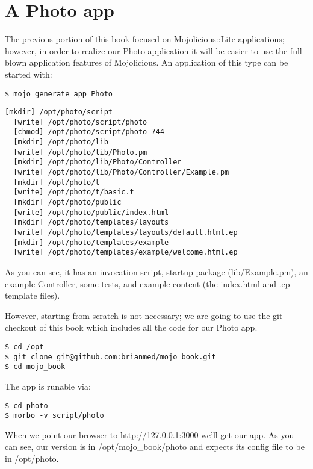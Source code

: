 \documentclass[14pt]{extreport}
\begin{document}
\section{A Photo app}

The previous portion of this book focused on Mojolicious::Lite applications;
however, in order to realize our Photo application it will be easier to use the
full blown application features of Mojolicious.  An application of this type
can be started with:

\begin{lstlisting}[style=BashInputStyle]
$ mojo generate app Photo           
\end{lstlisting}

\begin{lstlisting}[style=BashOutputStyle]
  [mkdir] /opt/photo/script
  [write] /opt/photo/script/photo
  [chmod] /opt/photo/script/photo 744
  [mkdir] /opt/photo/lib
  [write] /opt/photo/lib/Photo.pm
  [mkdir] /opt/photo/lib/Photo/Controller
  [write] /opt/photo/lib/Photo/Controller/Example.pm
  [mkdir] /opt/photo/t
  [write] /opt/photo/t/basic.t
  [mkdir] /opt/photo/public
  [write] /opt/photo/public/index.html
  [mkdir] /opt/photo/templates/layouts
  [write] /opt/photo/templates/layouts/default.html.ep
  [mkdir] /opt/photo/templates/example
  [write] /opt/photo/templates/example/welcome.html.ep
\end{lstlisting}

As you can see, it has an invocation script, startup package (lib/Example.pm),
an example Controller, some tests, and example content (the index.html and .ep
template files).

However, starting from scratch is not necessary; we are going to use the git
checkout of this book which includes all the code for our Photo app.

\begin{lstlisting}[style=BashOutputStyle]
$ cd /opt
$ git clone git@github.com:brianmed/mojo_book.git
$ cd mojo_book
\end{lstlisting}

The app is runable via:

\begin{lstlisting}[style=BashInputStyle]
$ cd photo
$ morbo -v script/photo
\end{lstlisting}

When we point our browser to http://127.0.0.1:3000 we'll get our app.  As you
can see, our version is in /opt/mojo\_book/photo and expects its config file to
be in /opt/photo.
\end{document}
